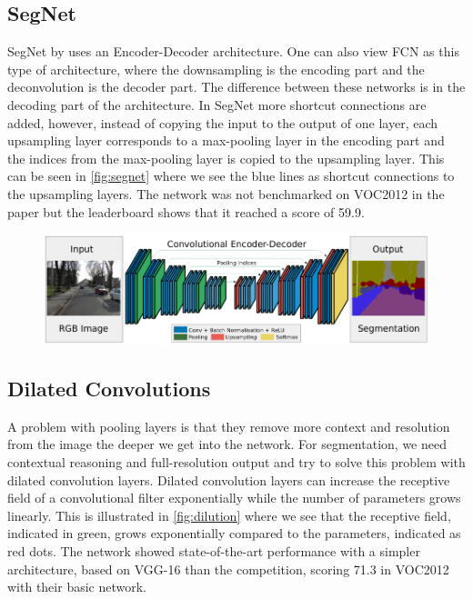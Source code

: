 \subsection{SegNet}
SegNet by \citet{Badrinarayanan2015} uses an Encoder-Decoder architecture. One can also view FCN as this type of architecture, where the downsampling is the encoding part and the deconvolution is the decoder part. The difference between these networks is in the decoding part of the architecture. In SegNet more shortcut connections are added, however, instead of copying the input to the output of one layer, each upsampling layer corresponds to a max-pooling layer in the encoding part and the indices from the max-pooling layer is copied to the upsampling layer. This can be seen in \autoref{fig:segnet} where we see the blue lines as shortcut connections to the upsampling layers. The network was not benchmarked on VOC2012 in the paper but the leaderboard \cite{PASCALVOC2012a} shows that it reached a score of 59.9. 

\begin{figure}[H]
    \centering
    \includegraphics[width=0.7\linewidth]{fig/segnet.png}
    \label{fig:segnet}
\end{figure}


\subsection{Dilated Convolutions}
A problem with pooling layers is that they remove more context and resolution from the image the deeper we get into the network. For segmentation, we need contextual reasoning and full-resolution output and \citet{Yu2015} try to solve this problem with dilated convolution layers. Dilated convolution layers can increase the receptive field of a convolutional filter exponentially while the number of parameters grows linearly. This is illustrated in \autoref{fig:dilution} where we see that the receptive field,  indicated in green, grows exponentially compared to the parameters, indicated as red dots. The network showed state-of-the-art performance with a simpler architecture, based on VGG-16 \cite{Simonyan2014a} than the competition, scoring 71.3 in VOC2012 with their basic network.

